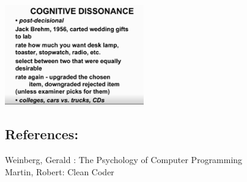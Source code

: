 \includegraphics[width=6cm]{CognitDissonance4Screenshot_2022-07-08_213727.jpg}



\hypertarget{a1ux5e73ux8861ux5fc3ux6001-cognitive-dissonance}{%
\subsection{References:}\label{a1ux5e73ux8861ux5fc3ux6001-cognitive-dissonance}}

Weinberg, Gerald : The Psychology of Computer Programming\\
Martin, Robert: Clean Coder\\

